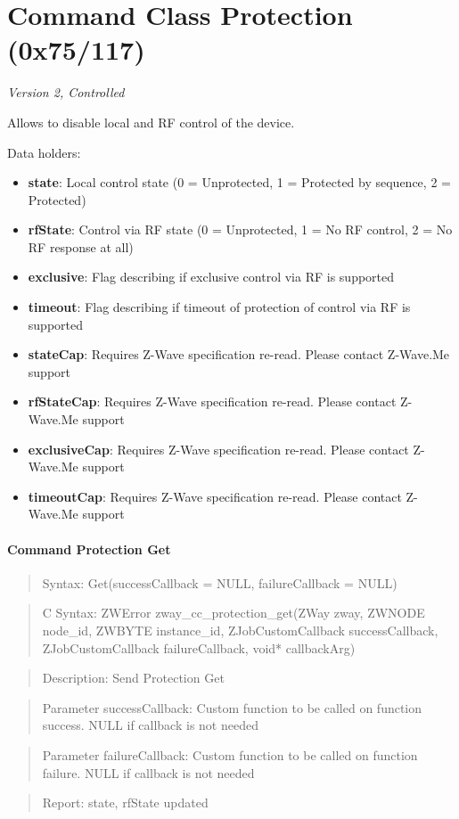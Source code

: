 \section{Command Class Protection (0x75/117)}

\textit{Version 2, Controlled}
\newline

Allows to disable local and RF control of the device.
\newline

\noindent
Data holders:

\begin{itemize}
\item \textbf{state}: Local control state (0 = Unprotected, 1 = Protected by sequence, 2 = Protected)
\item \textbf{rfState}: Control via RF state (0 = Unprotected, 1 = No RF control, 2 = No RF response at all)
\item \textbf{exclusive}: Flag describing if exclusive control via RF is supported
\item \textbf{timeout}: Flag describing if timeout of protection of control via RF is supported
\item \textbf{stateCap}: Requires Z-Wave specification re-read. Please contact Z-Wave.Me support
\item \textbf{rfStateCap}: Requires Z-Wave specification re-read. Please contact Z-Wave.Me support
\item \textbf{exclusiveCap}: Requires Z-Wave specification re-read. Please contact Z-Wave.Me support
\item \textbf{timeoutCap}: Requires Z-Wave specification re-read. Please contact Z-Wave.Me support
\end{itemize}

\paragraph{Command Protection Get}
\begin{quote}Syntax: Get(successCallback = NULL, failureCallback = NULL)\end{quote}
\begin{quote}C Syntax: ZWError zway\_cc\_protection\_get(ZWay zway, ZWNODE node\_id, ZWBYTE instance\_id, ZJobCustomCallback successCallback, ZJobCustomCallback failureCallback, void* callbackArg)\end{quote}
\begin{quote}Description: Send Protection Get\end{quote}
\begin{quote}Parameter successCallback: Custom function to be called on function success. NULL if callback is not needed\end{quote}
\begin{quote}Parameter failureCallback: Custom function to be called on function failure. NULL if callback is not needed\end{quote}
\begin{quote}Report: state, rfState updated\end{quote}

